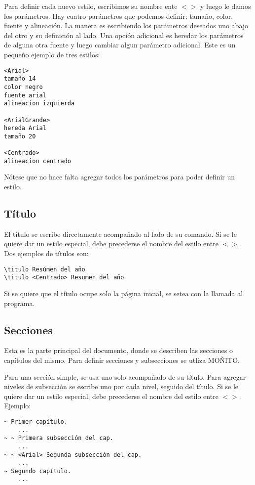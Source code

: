 \documentclass{article}
\begin{document}
Para definir cada nuevo estilo, escribimos su nombre ente $< >$ y luego le damos los parámetros. Hay cuatro parámetros que podemos definir: tamaño, color, fuente y alineación. La manera es escribiendo los parámetros deseados uno abajo del otro y su definición al lado. Una opción adicional es heredar los parámetros de alguna otra fuente y luego cambiar algun parámetro adicional. Este es un pequeño ejemplo de tres estilos:
\newpage
\begin{verbatim}
<Arial>
tamaño 14
color negro
fuente arial
alineacion izquierda

<ArialGrande>
hereda Arial
tamaño 20

<Centrado>
alineacion centrado
\end{verbatim}
Nótese que no hace falta agregar todos los parámetros para poder definir un estilo.

\subsection{Título}

El título se escribe directamente acompañado al lado de su comando. Si se le quiere dar un estilo especial, debe precederse el nombre del estilo entre  $< >$. Dos ejemplos de títulos son:
\begin{verbatim}
\titulo Resúmen del año
\titulo <Centrado> Resumen del año
\end{verbatim}

Si se quiere que el título ocupe solo la página inicial, se setea con la llamada al programa.

\subsection{Secciones}

Esta es la parte principal del documento, donde se describen las secciones o capítulos del mismo. Para definir secciones y subsecciones se utliza MOÑITO.

Para una sección simple, se usa uno solo acompañado de su título. Para agregar niveles de subsección se escribe uno por cada nivel, seguido del título.  Si se le quiere dar un estilo especial, debe precederse el nombre del estilo entre  $< >$.\\
Ejemplo:
\begin{verbatim}
~ Primer capítulo.
    ...
~ ~ Primera subsección del cap.
    ...
~ ~ <Arial> Segunda subsección del cap.
    ...
~ Segundo capítulo.
    ...
\end{verbatim}
\end{document}
